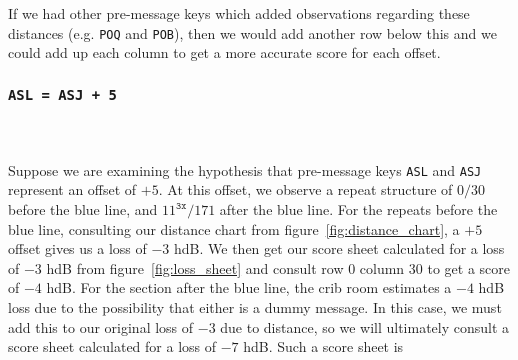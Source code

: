   \noindent If we had other pre-message keys which added observations
  regarding these distances (e.g. \texttt{POQ} and \texttt{POB}),
  then we would add another row below this and we could add up each
  column to get a more accurate score for each offset.

  \subsubsection{\texttt{ASL = ASJ + 5}}
  \text{}\\\\Suppose we are examining the hypothesis that pre-message
  keys \texttt{ASL} and \texttt{ASJ} represent an offset of $+5$. At
  this offset, we observe a repeat structure of $0/30$ before the
  blue line, and $11^\texttt{3x}/171$ after the blue line. For the
  repeats before the blue line, consulting our distance chart from
  figure~\ref{fig:distance_chart}, a $+5$ offset gives us a loss of
  $-3$ hdB. We then get our score sheet calculated for a loss of $-3$
  hdB from figure~\ref{fig:loss_sheet} and consult row $0$ column
  $30$ to get a score of $-4$ hdB. For the section after the blue
  line, the crib room estimates a $-4$ hdB loss due to the
  possibility that either is a dummy message. In this case, we must
  add this to our original loss of $-3$ due to distance, so we will
  ultimately consult a score sheet calculated for a loss of $-7$ hdB.
  Such a score sheet is
